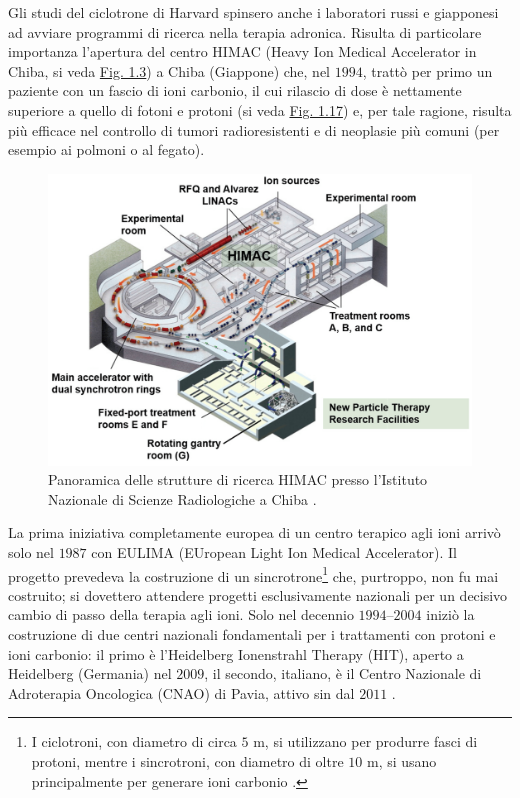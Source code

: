 \documentclass[12pt,a4paper,twoside]{report}
\begin{document}
	Gli studi del ciclotrone di Harvard spinsero anche i laboratori russi e giapponesi ad avviare programmi di ricerca nella terapia adronica. Risulta di particolare importanza l'apertura del centro HIMAC (Heavy Ion Medical Accelerator in Chiba, si veda \hyperref[fig:himac]{Fig. 1.3}) \cite{hirao1992heavy} a Chiba (Giappone) che, nel $1994$, trattò per primo un paziente con un fascio di ioni carbonio, il cui rilascio di dose è nettamente superiore a quello di fotoni e protoni (si veda \hyperref[fig:photon]{Fig. 1.17}) e, per tale ragione, risulta più efficace nel controllo di tumori radioresistenti e di neoplasie più comuni (per esempio ai polmoni o al fegato).
	\begin{figure}[H]
		\centering
		\includegraphics[width=0.7\linewidth]{himac.png}
		\caption{Panoramica delle strutture di ricerca HIMAC presso l'Istituto Nazionale di Scienze Radiologiche a Chiba \cite{cancers10030066}.}
		\label{fig:himac}
	\end{figure}
	La prima iniziativa completamente europea di un centro terapico agli ioni arrivò solo nel $1987$ con EULIMA (EUropean Light Ion Medical Accelerator). Il progetto prevedeva la costruzione di un sincrotrone\footnote{I ciclotroni, con diametro di circa $5\mbox{ m}$, si utilizzano per produrre fasci di protoni, mentre i sincrotroni, con diametro di oltre $10\mbox{ m}$, si usano principalmente per generare ioni carbonio \cite{asimmetrie_curareCLP}.} che, purtroppo, non fu mai costruito; si dovettero attendere progetti esclusivamente nazionali per un decisivo cambio di passo della terapia agli ioni. Solo nel decennio $1994$--$2004$ iniziò la costruzione di due centri nazionali fondamentali per i trattamenti con protoni e ioni carbonio: il primo è l'Heidelberg Ionenstrahl Therapy (HIT), aperto a Heidelberg (Germania) nel $2009$, il secondo, italiano, è il Centro Nazionale di Adroterapia Oncologica (CNAO) di Pavia, attivo sin dal $2011$ \cite{amaldi_article}.
	
\end{document}
